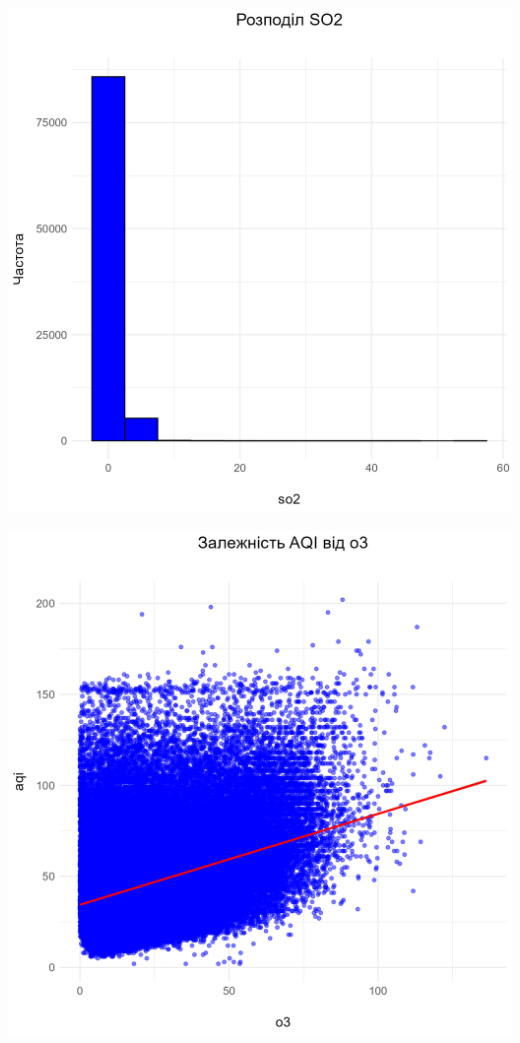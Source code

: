\documentclass[./report.tex]{subfiles}
\begin{document}
\begin{enumerate}
  \includegraphics[width=\linewidth]{plots/question2/so2_plot.png}

  \includegraphics[width=\linewidth]{plots/question2/scatter_plot.png}


\end{enumerate}
\end{document}
